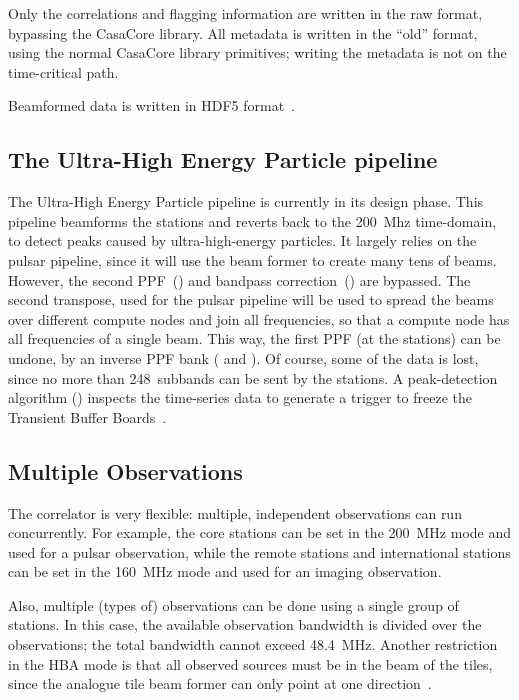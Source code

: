 Only the correlations and flagging information are written in the raw
format, bypassing the CasaCore library.
All metadata is written in the ``old'' format, using the normal CasaCore
library primitives; writing the metadata is not on the time-critical path.

Beamformed data is written in HDF5 format~\cite{?}.



\subsection{The Ultra-High Energy Particle pipeline}

The Ultra-High Energy Particle pipeline is currently in its design phase.
This pipeline beamforms the stations and reverts back to the 200~Mhz
time-domain, to detect peaks caused by ultra-high-energy particles.
It largely relies on the pulsar pipeline, since it will use the beam former
to create many tens of beams.
However, the second PPF~() and bandpass
correction~() are bypassed.
The second transpose, used for the pulsar pipeline will be used to spread the
beams over different compute nodes and join all frequencies, so that a compute
node has all frequencies of a single beam.
This way, the first PPF (at the stations) can be undone, by an inverse PPF bank
( and ).
Of course, some of the data is lost, since no more than 248~subbands can be
sent by the stations.
A peak-detection algorithm () inspects the time-series data
to generate a trigger to freeze the Transient Buffer Boards~\cite{Kooistra:10}.



\subsection{Multiple Observations}

The correlator is very flexible: multiple, independent observations can
run concurrently.
For example, the core stations can be set in the 200~MHz mode and used for
a pulsar observation, while the remote stations and international stations
can be set in the 160~MHz mode and used for an imaging observation.

Also, multiple (types of) observations can be done using a single group of
stations.
In this case, the available observation bandwidth is divided over the
observations; the total bandwidth cannot exceed 48.4~MHz.
Another restriction in the HBA mode is that all observed sources must be in the
beam of the tiles, since the analogue tile beam former can only point at one
direction~\cite{?}.

